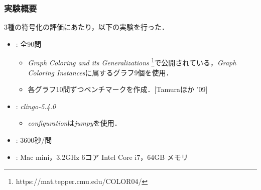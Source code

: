 \documentclass[dvipdfmx,11pt]{beamer}
\begin{document}
\begin{comment}
\begin{frame}\frametitle{ベンチマーク}

  \begin{itemize}
    \item 現時点で組合せ遷移問題は理論面の研究が主流であり, ベンチマークの整備が必要.
    \item 実験においてステップ$t$を与えるとき, その上限値が必要となる.
    \item ステップ$t$の上限値は, グラフ$G$を$k$彩色するときの実行可能解の数と等しい.
  \end{itemize}

  従って, 全解列挙が可能な($G, k$)からベンチマークを生成する必要がある.
  
\end{frame}
\end{comment}

\begin{frame}\frametitle{実験概要}

  3種の符号化の評価にあたり，以下の実験を行った．
  \begin{itemize}
    \item {}: 全90問
    \begin{itemize}
      \item \textit{Graph Coloring and its Generalizations}
      \footnote{https://mat.tepper.cmu.edu/COLOR04/}で公開されている，\textit{Graph Coloring Instances}に属するグラフ9個を使用．
      \item 各グラフ10問ずつベンチマークを作成．[Tamuraほか '09]
    \end{itemize}

    \item {}: \textit{clingo-5.4.0}
      \begin{itemize}
        \item \textit{configuration}は\textit{jumpy}を使用．
      \end{itemize}
    \item {}: 3600秒/問
    \item {}: Mac mini，3.2GHz 6コア Intel Core i7，64GB メモリ
  \end{itemize}
  
\end{frame}
\end{document}
